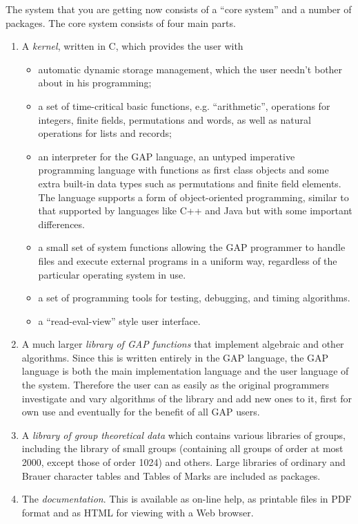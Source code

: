 \documentclass[a4paper,11pt]{report}
\begin{document}
{{ The system that you are getting now consists of a ``core system'' and a number of packages. The core system consists of four main parts. 
\begin{enumerate}
\item  A \emph{kernel}, written in C, which provides the user with 
\begin{itemize}
\item  automatic dynamic storage management, which the user needn't bother about in
his programming; 
\item  a set of time-critical basic functions, e.g. ``arithmetic'', operations for integers, finite fields, permutations and words, as well as
natural operations for lists and records; 
\item  an interpreter for the \textsf{GAP} language, an untyped imperative programming language with functions as first
class objects and some extra built-in data types such as permutations and
finite field elements. The language supports a form of object-oriented
programming, similar to that supported by languages like C++ and Java but with
some important differences. 
\item  a small set of system functions allowing the \textsf{GAP} programmer to handle files and execute external programs in a uniform way,
regardless of the particular operating system in use. 
\item  a set of programming tools for testing, debugging, and timing algorithms. 
\item  a ``read-eval-view'' style user interface. 
\end{itemize}
 
\item  A much larger \emph{library of \textsf{GAP} functions} that implement algebraic and other algorithms. Since this is written entirely
in the \textsf{GAP} language, the \textsf{GAP} language is both the main implementation language and the user language of the
system. Therefore the user can as easily as the original programmers
investigate and vary algorithms of the library and add new ones to it, first
for own use and eventually for the benefit of all \textsf{GAP} users. 
\item  A \emph{library of group theoretical data} which contains various libraries of groups, including the library of small
groups (containing all groups of order at most 2000, except those of order
1024) and others. Large libraries of ordinary and Brauer character tables and
Tables of Marks are included as packages. 
\item  The \emph{documentation}. This is available as on-line help, as printable files in PDF format and as
HTML for viewing with a Web browser. 
\end{enumerate}
 

}}
\end{document}
